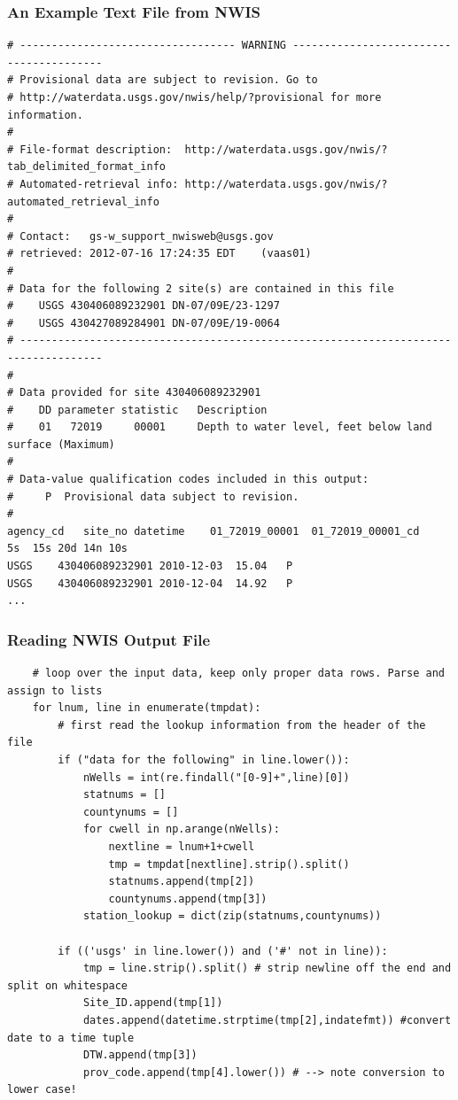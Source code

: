 \documentclass{beamer}
\begin{document}
\begin{frame}[fragile]
\frametitle{An Example Text File from NWIS}
\begin{tiny}
\begin{verbatim}
# ---------------------------------- WARNING ----------------------------------------
# Provisional data are subject to revision. Go to
# http://waterdata.usgs.gov/nwis/help/?provisional for more information.
#
# File-format description:  http://waterdata.usgs.gov/nwis/?tab_delimited_format_info
# Automated-retrieval info: http://waterdata.usgs.gov/nwis/?automated_retrieval_info
#
# Contact:   gs-w_support_nwisweb@usgs.gov
# retrieved: 2012-07-16 17:24:35 EDT	(vaas01)
#
# Data for the following 2 site(s) are contained in this file
#    USGS 430406089232901 DN-07/09E/23-1297
#    USGS 430427089284901 DN-07/09E/19-0064
# -----------------------------------------------------------------------------------
#
# Data provided for site 430406089232901
#    DD parameter statistic   Description
#    01   72019     00001     Depth to water level, feet below land surface (Maximum)
#
# Data-value qualification codes included in this output:
#     P  Provisional data subject to revision.
#
agency_cd	site_no	datetime	01_72019_00001	01_72019_00001_cd
5s	15s	20d	14n	10s
USGS	430406089232901	2010-12-03	15.04	P
USGS	430406089232901	2010-12-04	14.92	P
...
\end{verbatim}
\end{tiny}
\end{frame}


\begin{frame}[fragile]
\frametitle{Reading NWIS Output File}
\begin{lstlisting}
    # loop over the input data, keep only proper data rows. Parse and assign to lists
    for lnum, line in enumerate(tmpdat):
        # first read the lookup information from the header of the file
        if ("data for the following" in line.lower()):
            nWells = int(re.findall("[0-9]+",line)[0])
            statnums = []
            countynums = []
            for cwell in np.arange(nWells):
                nextline = lnum+1+cwell
                tmp = tmpdat[nextline].strip().split()
                statnums.append(tmp[2])
                countynums.append(tmp[3])
            station_lookup = dict(zip(statnums,countynums))
                
        if (('usgs' in line.lower()) and ('#' not in line)):
            tmp = line.strip().split() # strip newline off the end and split on whitespace
            Site_ID.append(tmp[1])
            dates.append(datetime.strptime(tmp[2],indatefmt)) #convert date to a time tuple
            DTW.append(tmp[3])
            prov_code.append(tmp[4].lower()) # --> note conversion to lower case!
\end{lstlisting}
\end{frame}
\end{document}
